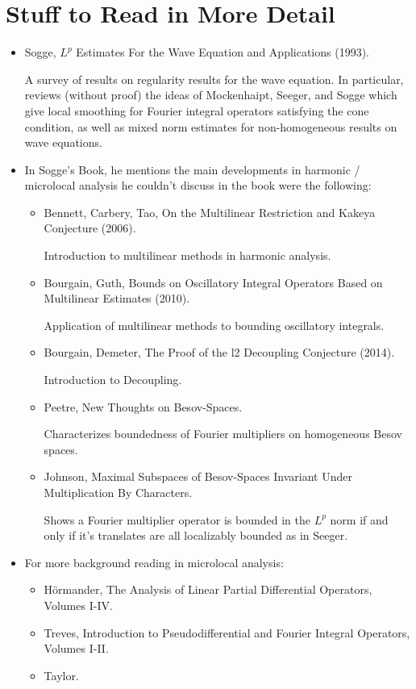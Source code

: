 \part{Stuff to Read in More Detail}

\begin{itemize}
    \item Sogge, $L^p$ Estimates For the Wave Equation and Applications (1993).

    A survey of results on regularity results for the wave equation. In particular, reviews (without proof) the ideas of Mockenhaipt, Seeger, and Sogge which give local smoothing for Fourier integral operators satisfying the cone condition, as well as mixed norm estimates for non-homogeneous results on wave equations.

    \item In Sogge's Book, he mentions the main developments in harmonic / microlocal analysis he couldn't discuss in the book were the following:
    \begin{itemize}
        \item Bennett, Carbery, Tao, On the Multilinear Restriction and Kakeya Conjecture (2006).

        Introduction to multilinear methods in harmonic analysis.

        \item Bourgain, Guth, Bounds on Oscillatory Integral Operators Based on Multilinear Estimates (2010).

        Application of multilinear methods to bounding oscillatory integrals.

        \item Bourgain, Demeter, The Proof of the l2 Decoupling Conjecture (2014).

        Introduction to Decoupling.

        \item Peetre, New Thoughts on Besov-Spaces.

        Characterizes boundedness of Fourier multipliers on homogeneous Besov spaces.

        \item Johnson, Maximal Subspaces of Besov-Spaces Invariant Under Multiplication By Characters.

            Shows a Fourier multiplier operator is bounded in the $L^p$ norm if and only if it's translates are all localizably bounded as in Seeger.
    \end{itemize}

    \item For more background reading in microlocal analysis:
    \begin{itemize}
        \item H\"{o}rmander, The Analysis of Linear Partial Differential Operators, Volumes I-IV.
        \item Treves, Introduction to Pseudodifferential and Fourier Integral Operators, Volumes I-II.
        \item Taylor.
    \end{itemize}


\end{itemize}
